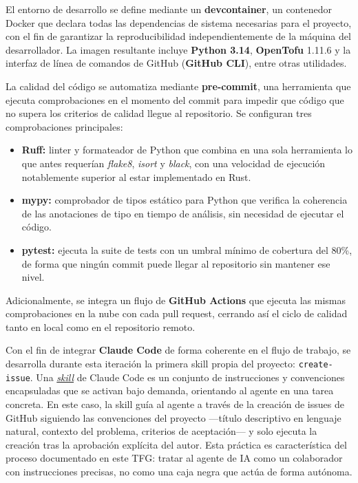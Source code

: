 El entorno de desarrollo se define mediante un \textbf{devcontainer}, un contenedor Docker
que declara todas las dependencias de sistema necesarias para el proyecto, con el fin de
garantizar la reproducibilidad independientemente de la máquina del desarrollador. La imagen
resultante incluye \textbf{Python 3.14}, \textbf{OpenTofu} 1.11.6 y la interfaz de línea de
comandos de GitHub (\textbf{GitHub CLI}), entre otras utilidades.

La calidad del código se automatiza mediante \textbf{pre-commit}, una herramienta que ejecuta
comprobaciones en el momento del commit para impedir que código que no supera los criterios
de calidad llegue al repositorio. Se configuran tres comprobaciones principales:

\begin{itemize}
    \item \textbf{Ruff:} linter y formateador de Python que combina en una sola herramienta
    lo que antes requerían \textit{flake8}, \textit{isort} y \textit{black}, con una velocidad
    de ejecución notablemente superior al estar implementado en Rust.
    \item \textbf{mypy:} comprobador de tipos estático para Python que verifica la coherencia
    de las anotaciones de tipo en tiempo de análisis, sin necesidad de ejecutar el código.
    \item \textbf{pytest:} ejecuta la suite de tests con un umbral mínimo de cobertura del
    80\%, de forma que ningún commit puede llegar al repositorio sin mantener ese nivel.
\end{itemize}

Adicionalmente, se integra un flujo de \textbf{GitHub Actions} que ejecuta las mismas
comprobaciones en la nube con cada pull request, cerrando así el ciclo de calidad tanto en
local como en el repositorio remoto.

Con el fin de integrar \textbf{Claude Code} \cite{claudeCode} de forma coherente en el
flujo de trabajo, se desarrolla durante esta iteración la primera skill propia del proyecto:
\texttt{create-issue}. Una \hyperlink{skill}{\textit{skill}} de Claude Code es un conjunto
de instrucciones y convenciones encapsuladas que se activan bajo demanda, orientando al
agente en una tarea concreta. En este caso, la skill guía al agente a través de la creación
de issues de GitHub siguiendo las convenciones del proyecto —título descriptivo en lenguaje
natural, contexto del problema, criterios de aceptación— y solo ejecuta la creación
tras la aprobación explícita del autor. Esta práctica es característica del proceso
documentado en este TFG: tratar al agente de IA como un colaborador con instrucciones
precisas, no como una caja negra que actúa de forma autónoma.

